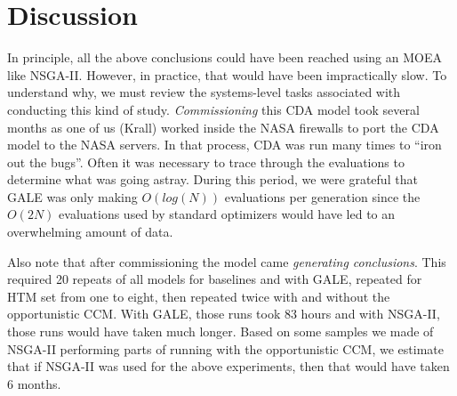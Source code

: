 \documentclass[journal]{IEEEtran}
\newcommand{\fig}[1]{Figure~\ref{fig:#1}}
\begin{document}



\section{Discussion}

In principle, all the above conclusions could have been reached using an MOEA like NSGA-II. 
However, in practice, that would have been impractically slow. 
To understand why, we must review the systems-level tasks associated with conducting this kind of study.
{\em Commissioning} this CDA model took several months as one of us (Krall) worked inside the NASA firewalls to port the CDA model to the NASA servers. 
In that process, CDA was run many times to ``iron out the bugs''.  
Often it was necessary to trace through the evaluations to determine what was
going astray. 
During this period, we were grateful that GALE was only making $O(log(N))$ evaluations per generation since the $O(2N)$ evaluations used by standard optimizers would have led to an overwhelming amount of data.

Also note that after commissioning the model came {\em generating conclusions}.
This required 20 repeats of all models for baselines and with GALE, repeated for HTM set from one to eight, then repeated twice
with and without the opportunistic CCM.
With GALE, those runs took 83 hours and with NSGA-II, those runs would have taken much longer.
Based on some samples we made of NSGA-II performing parts of running with the opportunistic CCM, we estimate that if NSGA-II was used for the above experiments, then that would have taken 6 months.
\end{document}
